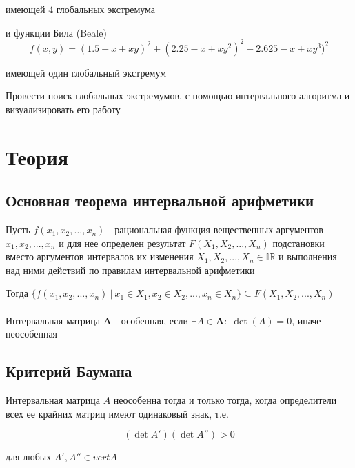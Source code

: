 \documentclass[12pt,a4paper]{article}
\begin{document}
            имеющей 4 глобальных экстремума 
            
            и функции Била (Beale)
            \begin{equation}
                    f(x, y) = (1.5 - x + xy)^2 + (2.25 - x + xy^2)^2 + 2.625 - x + xy^3)^2
               \end{equation}
               
               имеющей один глобальный экстремум
            
            Провести поиск глобальных экстремумов, с помощью интервального алгоритма и визуализировать его работу
            
	
        \pagebreak
	
	\section{Теория}
	
	    \subsection{Основная теорема интервальной арифметики} \label{main_theorem}
	        Пусть $f(x_1, x_2, ... , x_n)$ - рациональная функция вещественных аргументов $x_1, x_2, ... , x_n$ и для нее определен результат $F(X_1, X_2, ..., X_n)$ подстановки вместо аргументов интервалов их изменения $X_1, X_2, ... , X_n \in \mathbb{IR}$ и выполнения над ними действий по правилам интервальной арифметики
	        
	        Тогда $\{f(x_1, x_2, ... , x_n) \: | \: x_1 \in X_1, x_2 \in X_2, ... , x_n \in X_n\} \subseteq F(X_1, X_2, ... , X_n)$
	        \\
	        \\
            Интервальная матрица $\mathbf{A}$ - особенная, если $\exists A\in\mathbf{A}:\;\det(A)=0$, иначе - неособенная
        
        \subsection{Критерий Баумана}
            Интервальная матрица $A$ неособенна тогда и только тогда, когда определители всех ее крайних матриц имеют одинаковый знак, т.е.

            \begin{equation}
            	(\det A')(\det A'') > 0
            \end{equation}
            
            для любых $A', A'' \in vert A$
            
\end{document}
